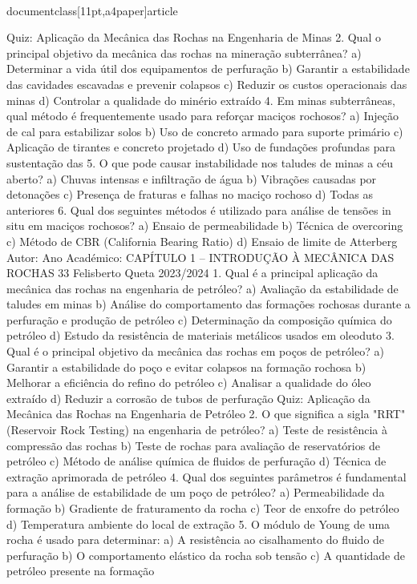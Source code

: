 \\documentclass[11pt,a4paper]{article}
\begin{document}
Quiz: Aplicação da 
Mecânica das 
Rochas na 
Engenharia de 
Minas
2. Qual o principal objetivo da mecânica das rochas na mineração subterrânea?
a) Determinar a vida útil dos equipamentos de perfuração
b) Garantir a estabilidade das cavidades escavadas e prevenir colapsos
c) Reduzir os custos operacionais das minas
d) Controlar a qualidade do minério extraído
4. Em minas subterrâneas, qual método é frequentemente usado para reforçar maciços rochosos?
a) Injeção de cal para estabilizar solos
b) Uso de concreto armado para suporte primário
c) Aplicação de tirantes e concreto projetado
d) Uso de fundações profundas para sustentação das
5. O que pode causar instabilidade nos taludes de minas a céu aberto?
a) Chuvas intensas e infiltração de água
b) Vibrações causadas por detonações
c) Presença de fraturas e falhas no maciço rochoso
d) Todas as anteriores
6. Qual dos seguintes métodos é utilizado para análise de tensões in situ em maciços rochosos?
a) Ensaio de permeabilidade
b) Técnica de overcoring
c) Método de CBR (California Bearing Ratio)
d) Ensaio de limite de Atterberg
Autor:
Ano Académico:
CAPÍTULO 1 – INTRODUÇÃO À MECÂNICA DAS ROCHAS 33
Felisberto Queta
2023/2024
1. Qual é a principal aplicação da mecânica das rochas na engenharia de petróleo?
a) Avaliação da estabilidade de taludes em minas
b) Análise do comportamento das formações rochosas durante a perfuração e produção de petróleo
c) Determinação da composição química do petróleo
d) Estudo da resistência de materiais metálicos usados em oleoduto
3. Qual é o principal objetivo da mecânica das rochas em poços de petróleo?
a) Garantir a estabilidade do poço e evitar colapsos na formação rochosa
b) Melhorar a eficiência do refino do petróleo
c) Analisar a qualidade do óleo extraído
d) Reduzir a corrosão de tubos de perfuração
Quiz: Aplicação da 
Mecânica das 
Rochas na 
Engenharia de 
Petróleo
2. O que significa a sigla "RRT" (Reservoir Rock Testing) na engenharia de petróleo?
a) Teste de resistência à compressão das rochas
b) Teste de rochas para avaliação de reservatórios de petróleo
c) Método de análise química de fluidos de perfuração
d) Técnica de extração aprimorada de petróleo
4. Qual dos seguintes parâmetros é fundamental para a análise de estabilidade de um poço de petróleo?
a) Permeabilidade da formação
b) Gradiente de fraturamento da rocha
c) Teor de enxofre do petróleo
d) Temperatura ambiente do local de extração
5. O módulo de Young de uma rocha é usado para determinar:
a) A resistência ao cisalhamento do fluido de perfuração
b) O comportamento elástico da rocha sob tensão
c) A quantidade de petróleo presente na formação
\end{document}
